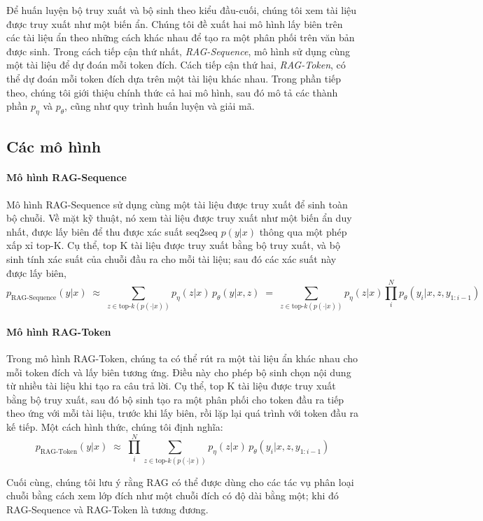 \documentclass[10pt,letterpaper]{article}
\newcommand{\topk}{\text{top-}k(p(\cdot|x))}
\begin{document}
Để huấn luyện bộ truy xuất và bộ sinh theo kiểu đầu-cuối, chúng tôi xem tài
liệu được truy xuất như một biến ẩn. Chúng tôi đề xuất hai mô hình lấy biên
trên các tài liệu ẩn theo những cách khác nhau để tạo ra một phân phối trên văn
bản được sinh. Trong cách tiếp cận thứ nhất, \emph{RAG-Sequence}, mô hình sử
dụng cùng một tài liệu để dự đoán mỗi token đích. Cách tiếp cận thứ hai,
\emph{RAG-Token}, có thể dự đoán mỗi token đích dựa trên một tài liệu khác
nhau. Trong phần tiếp theo, chúng tôi giới thiệu chính thức cả hai mô hình, sau
đó mô tả các thành phần $p_\eta$ và $p_\theta$, cũng như quy trình huấn luyện
và giải mã.

\subsection{Các mô hình}

\paragraph{Mô hình RAG-Sequence}
Mô hình RAG-Sequence sử dụng cùng một tài liệu được truy xuất để sinh toàn bộ
chuỗi. Về mặt kỹ thuật, nó xem tài liệu được truy xuất như một biến ẩn duy
nhất, được lấy biên để thu được xác suất seq2seq $p(y|x)$ thông qua một phép
xấp xỉ top-K. Cụ thể, top K tài liệu được truy xuất bằng bộ truy xuất, và bộ
sinh tính xác suất của chuỗi đầu ra cho mỗi tài liệu; sau đó các xác suất này
được lấy biên,
\[
  p_{\text{RAG-Sequence}}(y|x) \;\approx\; \sum_{z\in\topk} p_\eta(z|x)\,
  p_\theta(y|x,z) \;=\; \sum_{z\in\topk} p_\eta(z|x) \prod_{i}^{N}
  p_\theta(y_i|x,z,y_{1:i-1})
\]

\paragraph{Mô hình RAG-Token}
Trong mô hình RAG-Token, chúng ta có thể rút ra một tài liệu ẩn khác nhau cho
mỗi token đích và lấy biên tương ứng. Điều này cho phép bộ sinh chọn nội dung
từ nhiều tài liệu khi tạo ra câu trả lời. Cụ thể, top K tài liệu được truy xuất
bằng bộ truy xuất, sau đó bộ sinh tạo ra một phân phối cho token đầu ra tiếp
theo ứng với mỗi tài liệu, trước khi lấy biên, rồi lặp lại quá trình với token
đầu ra kế tiếp. Một cách hình thức, chúng tôi định nghĩa:
\[
  p_{\text{RAG-Token}}(y|x) \;\approx\; \prod_{i}^{N} \sum_{z\in\topk}
  p_\eta(z|x)\, p_\theta(y_i|x,z,y_{1:i-1})
\]

Cuối cùng, chúng tôi lưu ý rằng RAG có thể được dùng cho các tác vụ phân loại
chuỗi bằng cách xem lớp đích như một chuỗi đích có độ dài bằng một; khi đó
RAG-Sequence và RAG-Token là tương đương.
\end{document}
